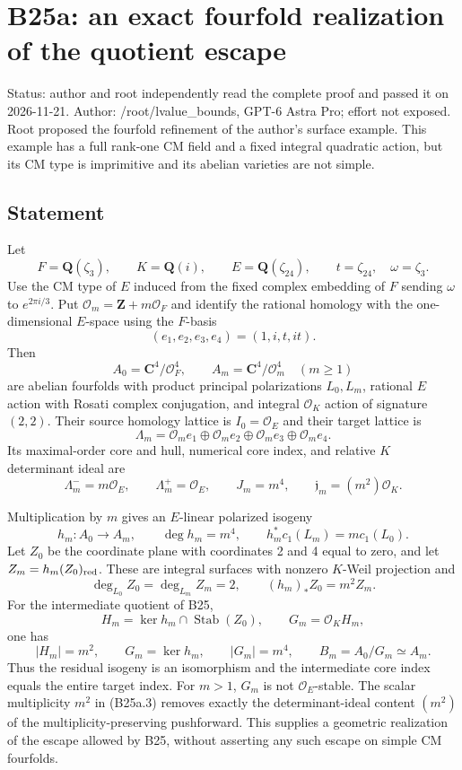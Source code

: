 \providecommand{\tightlist}{\setlength{\itemsep}{0pt}\setlength{\parskip}{0pt}}
\section{B25a: an exact fourfold realization of the quotient escape}\label{b25a-an-exact-fourfold-realization-of-the-quotient-escape}

Status: author and root independently read the complete proof and passed it on 2026-11-21. Author: /root/lvalue\_bounds, GPT-6 Astra Pro; effort not exposed. Root proposed the fourfold refinement of the author's surface example. This example has a full rank-one CM field and a fixed integral quadratic action, but its CM type is imprimitive and its abelian varieties are not simple.

\subsection{Statement}\label{statement}

Let \[
 F=\mathbf Q(\zeta_3),\qquad K=\mathbf Q(i),\qquad
 E=\mathbf Q(\zeta_{24}),\qquad t=\zeta_{24},\quad \omega=\zeta_3.
\] Use the CM type of \(E\) induced from the fixed complex embedding of \(F\) sending \(\omega\) to \(e^{2\pi i/3}\). Put \(\mathcal O_m=\mathbf Z+m\mathcal O_F\) and identify the rational homology with the one-dimensional \(E\)-space using the \(F\)-basis \[
 (e_1,e_2,e_3,e_4)=(1,i,t,it).
\] Then \[
 A_0=\mathbf C^4/\mathcal O_F^4,\qquad
 A_m=\mathbf C^4/\mathcal O_m^4\quad(m\ge1)
\] are abelian fourfolds with product principal polarizations \(L_0,L_m\), rational \(E\) action with Rosati complex conjugation, and integral \(\mathcal O_K\) action of signature \((2,2)\). Their source homology lattice is \(I_0=\mathcal O_E\) and their target lattice is \[
 \Lambda_m=\mathcal O_m e_1\oplus\mathcal O_m e_2
              \oplus\mathcal O_m e_3\oplus\mathcal O_m e_4.
\] Its maximal-order core and hull, numerical core index, and relative \(K\) determinant ideal are \[
 \Lambda_m^-=m\mathcal O_E,\qquad \Lambda_m^+=\mathcal O_E,
 \qquad J_m=m^4,
 \qquad \mathfrak j_m=(m^2)\mathcal O_K.
\tag{B25a.1}
\]

Multiplication by \(m\) gives an \(E\)-linear polarized isogeny \[
 h_m:A_0\longrightarrow A_m,\qquad
 \deg h_m=m^4,
 \qquad h_m^*c_1(L_m)=m c_1(L_0).
\tag{B25a.2}
\] Let \(Z_0\) be the coordinate plane with coordinates 2 and 4 equal to zero, and let \(Z_m=h_m(Z_0)_{\rm red}\). These are integral surfaces with nonzero \(K\)-Weil projection and \[
 \deg_{L_0}Z_0=\deg_{L_m}Z_m=2,
 \qquad (h_m)_*Z_0=m^2 Z_m.
\tag{B25a.3}
\] For the intermediate quotient of B25, \[
 H_m=\ker h_m\cap\operatorname{Stab}(Z_0),\qquad
 G_m=\mathcal O_K H_m,
\] one has \[
 |H_m|=m^2,\qquad
 G_m=\ker h_m,\qquad |G_m|=m^4,
 \qquad B_m=A_0/G_m\simeq A_m.
\tag{B25a.4}
\] Thus the residual isogeny is an isomorphism and the intermediate core index equals the entire target index. For \(m>1\), \(G_m\) is not \(\mathcal O_E\)-stable. The scalar multiplicity \(m^2\) in (B25a.3) removes exactly the determinant-ideal content \((m^2)\) of the multiplicity-preserving pushforward. This supplies a geometric realization of the escape allowed by B25, without asserting any such escape on simple CM fourfolds.

